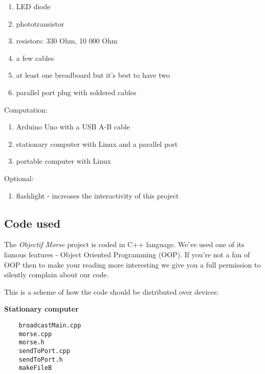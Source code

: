 \documentclass[12pt]{report}
\begin{document}
\begin{enumerate}

\item LED diode
\item phototransistor
\item resistors: 330 Ohm, 10 000 Ohm
\item a few cables
\item at least one breadboard but it's best to have two
\item parallel port plug with soldered cables

\end{enumerate}

\newpage

Computation:

\begin{enumerate}

\item Arduino Uno with a USB A-B cable
\item stationary computer with Linux and a parallel port
\item portable computer with Linux

\end{enumerate}

Optional:

\begin{enumerate}

\item flashlight - increases the interactivity of this project

\end{enumerate}


\subsection{Code used}

The \textit{Objectif Morse} project is coded in C++ language. We've used one of its famous features - Object Oriented Programming (OOP). If you're not a fan of OOP then to make your reading more interesting we give you a full permission to silently complain about our code.

This is a scheme of how the code should be distributed over devices:

\textbf{Stationary computer}

\begin{verbatim}
	broadcastMain.cpp
	morse.cpp
	morse.h
	sendToPort.cpp
	sendToPort.h
	makeFileB
\end{verbatim}
\end{document}
